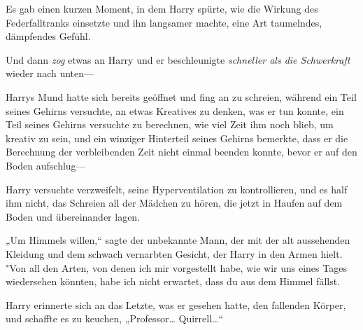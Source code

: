 Es gab einen kurzen Moment, in dem Harry spürte, wie die Wirkung des Federfalltranks einsetzte und ihn langsamer machte, eine Art taumelndes, dämpfendes Gefühl.

Und dann \emph{zog} etwas an Harry und er beschleunigte \emph{schneller als die Schwerkraft} wieder nach unten—

Harrys Mund hatte sich bereits geöffnet und fing an zu schreien, während ein Teil seines Gehirns versuchte, an etwas Kreatives zu denken, was er tun konnte, ein Teil seines Gehirns versuchte zu berechnen, wie viel Zeit ihm noch blieb, um kreativ zu sein, und ein winziger Hinterteil seines Gehirns bemerkte, dass er die Berechnung der verbleibenden Zeit nicht einmal beenden konnte, bevor er auf den Boden aufschlug—

\later

Harry versuchte verzweifelt, seine Hyperventilation zu kontrollieren, und es half ihm nicht, das Schreien all der Mädchen zu hören, die jetzt in Haufen auf dem Boden und übereinander lagen.

„Um Himmels willen,“ sagte der unbekannte Mann, der mit der alt aussehenden Kleidung und dem schwach vernarbten Gesicht, der Harry in den Armen hielt. "Von all den Arten, von denen ich mir vorgestellt habe, wie wir uns eines Tages wiedersehen könnten, habe ich nicht erwartet, dass du aus dem Himmel fällst.

Harry erinnerte sich an das Letzte, was er gesehen hatte, den fallenden Körper, und schaffte es zu keuchen, „Professor… Quirrell…“

